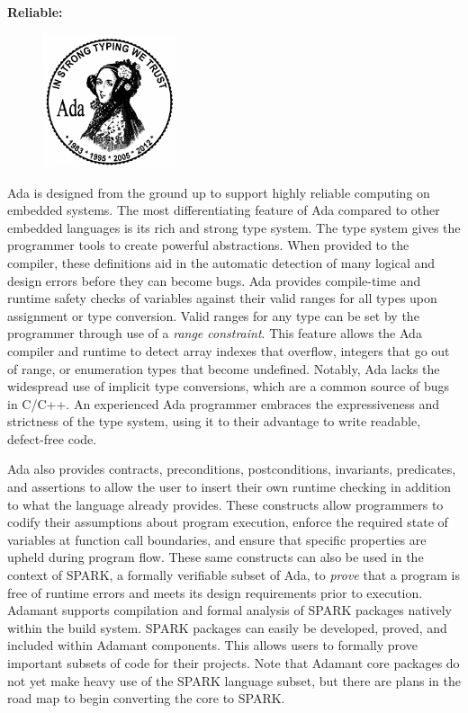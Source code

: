 \textbf{Reliable:} \\

\begin{figure}
  \includegraphics[width=0.35\textwidth]{images/ada.jpg}
\end{figure}

Ada is designed from the ground up to support highly reliable computing on embedded systems. The most differentiating feature of Ada compared to other embedded languages is its rich and strong type system. The type system gives the programmer tools to create powerful abstractions. When provided to the compiler, these definitions aid in the automatic detection of many logical and design errors before they can become bugs. Ada provides compile-time and runtime safety checks of variables against their valid ranges for all types upon assignment or type conversion. Valid ranges for any type can be set by the programmer through use of a \textit{range constraint}. This feature allows the Ada compiler and runtime to detect array indexes that overflow, integers that go out of range, or enumeration types that become undefined. Notably, Ada lacks the widespread use of implicit type conversions, which are a common source of bugs in C/C++. An experienced Ada programmer embraces the expressiveness and strictness of the type system, using it to their advantage to write readable, defect-free code.

Ada also provides contracts, preconditions, postconditions, invariants, predicates, and assertions to allow the user to insert their own runtime checking in addition to what the language already provides. These constructs allow programmers to codify their assumptions about program execution, enforce the required state of variables at function call boundaries, and ensure that specific properties are upheld during program flow. These same constructs can also be used in the context of SPARK, a formally verifiable subset of Ada, to \textit{prove} that a program is free of runtime errors and meets its design requirements prior to execution. Adamant supports compilation and formal analysis of SPARK packages natively within the build system. SPARK packages can easily be developed, proved, and included within Adamant components. This allows users to formally prove important subsets of code for their projects. Note that Adamant core packages do not yet make heavy use of the SPARK language subset, but there are plans in the road map to begin converting the core to SPARK. 

